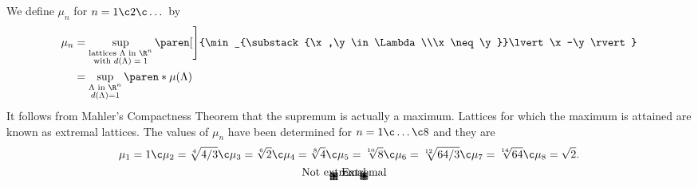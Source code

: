We define $\mu_n$ for $n=1\c 2\c \dotsc$ by
\begin{align*}
\mu_n &= \sup_{\substack{\text{lattices $\Lambda$ in $\R^n$}\\\text{with $d(\Lambda)=1$}}}\paren[\Bigg]{\min_{\substack{\x,\y\in\Lambda\\\x\neq\y}}\lvert\x-\y\rvert} \\
&= \sup_{\substack{\text{$\Lambda$ in $\R^n$}\\d(\Lambda)=1}}\paren*{\mu(\Lambda)} 
\end{align*}
It follows from Mahler's Compactness Theorem that the supremum is actually a maximum.  Lattices for which the maximum is attained are known as extremal lattices.  The values of $\mu_n$ have been determined for $n=1\c \dotsc\c 8$ and they are
\[ \mu_1 = 1\c  \mu_2 = \sqrt[4]{4/3}\c  \mu_3 = \sqrt[6]{2}\c  \mu_4 = \sqrt[8]{4}\c  \mu_5 = \sqrt[10]{8}\c  \mu_6 = \sqrt[12]{64/3}\c  \mu_7 = \sqrt[14]{64}\c  \mu_8 = \sqrt{2} . \]
\[ \begin{picture}(7,7.75)(-3.5,-3.5)
\put(-3.5,0){\vector(1,0){7}}
\put(0,-3.5){\vector(0,1){7}}
\multiput(-3,3)(1,0){7}{\circle*{0.1}}
\multiput(-3,2)(1,0){7}{\circle*{0.1}}
\multiput(-3,1)(1,0){7}{\circle*{0.1}}
\multiput(-3,0)(1,0){7}{\circle*{0.1}}
\multiput(-3,-1)(1,0){7}{\circle*{0.1}}
\multiput(-3,-2)(1,0){7}{\circle*{0.1}}
\multiput(-3,-3)(1,0){7}{\circle*{0.1}}
\put(0,4){\makebox(0,0){Not extremal}}
\end{picture}
\qquad
\begin{picture}(7,7.75)(-3.5,-3.5)
\put(-3.5,0){\vector(1,0){7}}
\put(0,-3.5){\vector(0,1){7}}
\put(0,0){\circle*{0.1}}
\multiput(-3.224,0)(1.075,0){7}{\circle*{0.1}}
\multiput(-3.224,1.861)(1.075,0){7}{\circle*{0.1}}
\multiput(-3.224,-1.861)(1.075,0){7}{\circle*{0.1}}
\multiput(-2.686,0.931)(1.075,0){6}{\circle*{0.1}}
\multiput(-2.686,-0.931)(1.075,0){6}{\circle*{0.1}}
\multiput(-2.686,2.792)(1.075,0){6}{\circle*{0.1}}
\multiput(-2.686,-2.792)(1.075,0){6}{\circle*{0.1}}
\put(0,4){\makebox(0,0){Extremal}}
\end{picture} \]
\vspace{-\baselineskip}